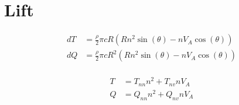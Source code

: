 \documentclass[12pt,a4]{article}
\begin{document}
\section{Lift}

\begin{align*}
	dT & = \frac{\rho}{2} \pi c R \left( Rn^2 \sin(\theta) - nV_A \cos(\theta) \right)   \\
	dQ & = \frac{\rho}{2} \pi c R^2 \left( Rn^2 \sin(\theta) - nV_A \cos(\theta) \right) \\
\end{align*}

\begin{align*}
	T & = T_{nn} n^2 + T_{nv} nV_A \\
	Q & = Q_{nn} n^2 + Q_{nv} nV_A
\end{align*}
\end{document}
